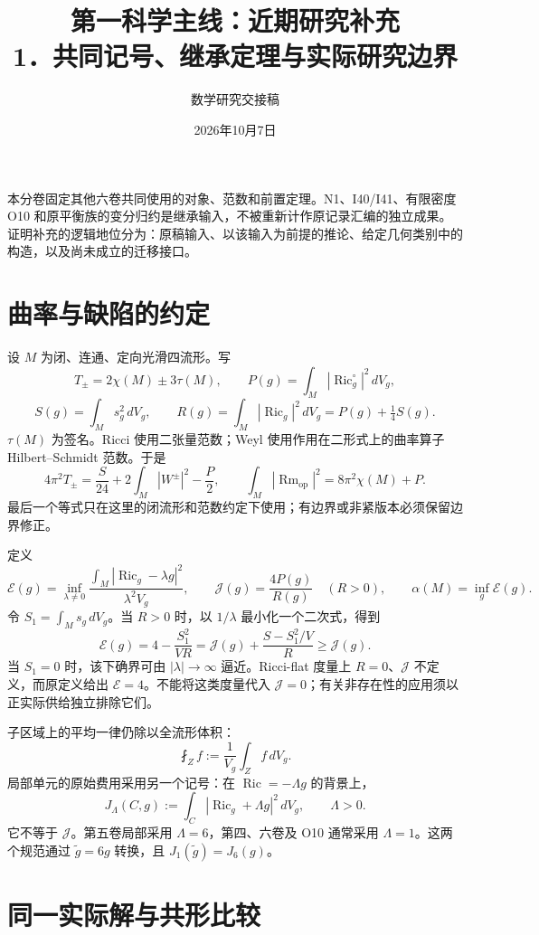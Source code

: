 \documentclass[UTF8,11pt,fontset=none]{ctexart}
\title{第一科学主线：近期研究补充\\[6pt]\large 1．共同记号、继承定理与实际研究边界}
\author{数学研究交接稿}\date{2026年10月7日}
\theoremstyle{definition}
\theoremstyle{remark}
\begin{document}
\maketitle
\tableofcontents
\clearpage
本分卷固定其他六卷共同使用的对象、范数和前置定理。N1、I40/I41、有限密度 O10 和原平衡族的变分归约是继承输入，不被重新计作原记录汇编的独立成果。证明补充的逻辑地位分为：原稿输入、以该输入为前提的推论、给定几何类别中的构造，以及尚未成立的迁移接口。\cite{I01,I02,B01}

\section{曲率与缺陷的约定}\label{v1-ux66f2ux7387ux4e0eux7f3aux9677ux7684ux7ea6ux5b9a}

设 \(M\) 为闭、连通、定向光滑四流形。写 \[
 T_\pm=2\chi(M)\pm3\tau(M),\qquad
 P(g)=\int_M|\operatorname{Ric}^{\circ}_g|^2\,dV_g,
\] \[
 S(g)=\int_Ms_g^2\,dV_g,\qquad
 R(g)=\int_M|\operatorname{Ric}_g|^2\,dV_g=P(g)+\tfrac14S(g).
\] \(\tau(M)\) 为签名。Ricci 使用二张量范数；Weyl 使用作用在二形式上的曲率算子 Hilbert--Schmidt 范数。于是 \[
 4\pi^2T_\pm=\frac{S}{24}+2\int_M|W^\pm|^2-\frac P2,
 \qquad
 \int_M|\operatorname{Rm}_{\mathrm{op}}|^2=8\pi^2\chi(M)+P.
\tag{1.1}
\] 最后一个等式只在这里的闭流形和范数约定下使用；有边界或非紧版本必须保留边界修正。

定义 \[
 \mathcal E(g)=\inf_{\lambda\ne0}
 \frac{\int_M|\operatorname{Ric}_g-\lambda g|^2}
 {\lambda^2 V_g},\qquad
 \mathcal J(g)=\frac{4P(g)}{R(g)}\quad(R>0),\qquad
 \alpha(M)=\inf_g\mathcal E(g).
\] 令 \(S_1=\int_Ms_g\,dV_g\)。当 \(R>0\) 时，以 \(1/\lambda\) 最小化一个二次式，得到 \[
 \mathcal E(g)=4-\frac{S_1^2}{VR}
 =\mathcal J(g)+\frac{S-S_1^2/V}{R}\ge\mathcal J(g).
\tag{1.2}
\] 当 \(S_1=0\) 时，该下确界可由 \(|\lambda|\to\infty\) 逼近。Ricci-flat 度量上 \(R=0\)、\(\mathcal J\) 不定义，而原定义给出 \(\mathcal E=4\)。不能将这类度量代入 \(\mathcal J=0\)；有关非存在性的应用须以正实际供给独立排除它们。

子区域上的平均一律仍除以全流形体积： \[
 \fint_Z f:=\frac1{V_g}\int_Z f\,dV_g.
\] 局部单元的原始费用采用另一个记号：在 \(\operatorname{Ric}=-\Lambda g\) 的背景上， \[
 J_\Lambda(C,g):=\int_C|\operatorname{Ric}_g+\Lambda g|^2\,dV_g,
 \qquad\Lambda>0.
\] 它不等于 \(\mathcal J\)。第五卷局部采用 \(\Lambda=6\)，第四、六卷及 O10 通常采用 \(\Lambda=1\)。这两个规范通过 \(\widetilde g=6g\) 转换，且 \(J_1(\widetilde g)=J_6(g)\)。

\section{同一实际解与共形比较}\label{v1-ux540cux4e00ux5b9eux9645ux89e3ux4e0eux5171ux5f62ux6bd4ux8f83}
\end{document}
